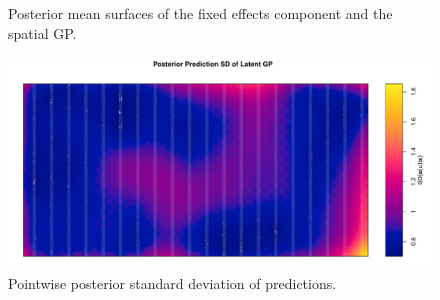 \documentclass[]{interact}
\begin{document}
\begin{figure}[h]


\caption{Posterior mean surfaces of the fixed effects component and the
spatial GP.}
\label{effortmean}
\end{figure}

\begin{figure}[h]
\includegraphics[width=\textwidth]{figures/bei-effort_sd.pdf}
\caption{Pointwise posterior standard deviation of predictions.}
\label{effortsd}
\end{figure}
\end{document}
